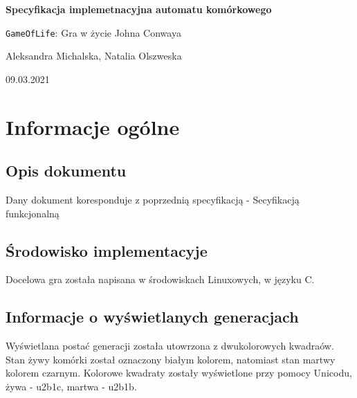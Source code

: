 \documentclass[a4paper]{article}
\begin{document}
\begin{titlepage}
	\begin{center}
		\vspace*{5cm}

	        \Huge
        	\textbf{Specyfikacja implemetnacyjna automatu kom\'orkowego}

        	\vspace{1cm}
	        \Huge
        	\texttt{GameOfLife}: Gra w \.zycie Johna Conwaya

    		\vspace{1.5cm}

	        \large
		Aleksandra Michalska, Natalia Olszweska

        	\vfill

	        \vspace{3cm}


		\large 09.03.2021
	\end{center}
\end{titlepage}


\tableofcontents
\newpage

\section{Informacje og\'olne}

\subsection{Opis dokumentu}

\quad Dany dokument koresponduje z poprzedni\k{a} specyfikacj\k{a} - Secyfikacj\k{a} funkcjonaln\k{a}

\subsection{\'Srodowisko implementacyje}
\quad Docelowa gra zosta\l{}a napisana w \'srodowiskach Linuxowych, w j\k{e}zyku C. 


\subsection{Informacje o wy\'swietlanych generacjach}

\quad Wy\'swietlana posta\'c generacji zosta\l{}a utowrzona z dwukolorowych kwadra\'ow. 
Stan \.zywy kom\'orki zosta\l{} oznaczony bia\l{}ym kolorem, natomiast stan martwy kolorem czarnym. 
Kolorowe kwadraty zosta\l{}y wy\'swietlone przy pomocy Unicodu, \.zywa - u2b1c, martwa - u2b1b. 
\end{document}
